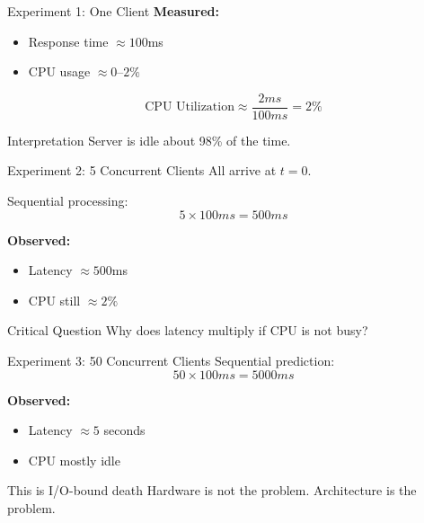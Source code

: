\documentclass[11pt]{beamer}
\begin{document}
	\begin{frame}{Experiment 1: One Client}
		\textbf{Measured:}
		\begin{itemize}
			\item Response time $\approx 100$ms
			\item CPU usage $\approx 0$--$2\%$
		\end{itemize}
		

		
		\[
		\text{CPU Utilization} \approx \frac{2ms}{100ms} = 2\%
		\]
		

		
		\begin{alertblock}{Interpretation}
			Server is idle about 98\% of the time.
		\end{alertblock}
	\end{frame}
	
	\begin{frame}{Experiment 2: 5 Concurrent Clients}
		All arrive at $t=0$.
		

		
		Sequential processing:
		\[
		5 \times 100ms = 500ms
		\]
		

		
		\textbf{Observed:}
		\begin{itemize}
			\item Latency $\approx 500$ms
			\item CPU still $\approx 2\%$
		\end{itemize}
		

		
		\begin{block}{Critical Question}
			Why does latency multiply if CPU is not busy?
		\end{block}
	\end{frame}
	
	\begin{frame}{Experiment 3: 50 Concurrent Clients}
		Sequential prediction:
		\[
		50 \times 100ms = 5000ms
		\]
		

		
		\textbf{Observed:}
		\begin{itemize}
			\item Latency $\approx 5$ seconds
			\item CPU mostly idle
		\end{itemize}
		

		\begin{alertblock}{This is I/O-bound death}
			Hardware is not the problem. Architecture is the problem.
		\end{alertblock}
	\end{frame}
	
\end{document}
